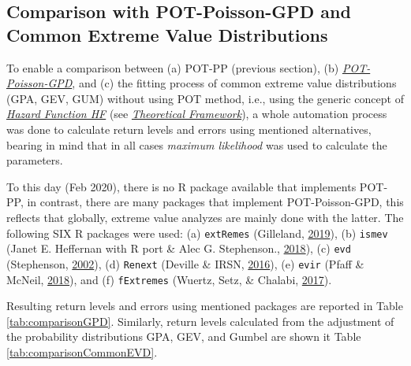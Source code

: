 \documentclass[12pt,twoside]{reedthesis}
\begin{document}
\hypertarget{comparison-with-pot-poisson-gpd-and-common-extreme-value-distributions}{%
\subsection{Comparison with POT-Poisson-GPD and Common Extreme Value Distributions}\label{comparison-with-pot-poisson-gpd-and-common-extreme-value-distributions}}

To enable a comparison between (a) POT-PP (previous section), (b) \emph{\protect\hyperlink{pot-poisson-gpd}{POT-Poisson-GPD}}, and (c) the fitting process of common extreme value distributions (GPA, GEV, GUM) without using POT method, i.e., using the generic concept of \emph{\protect\hyperlink{hf}{Hazard Function HF}} (see \emph{\protect\hyperlink{rmd-thefra}{Theoretical Framework}}), a whole automation process was done to calculate return levels and errors using mentioned alternatives, bearing in mind that in all cases \emph{maximum likelihood} was used to calculate the parameters.

To this day (Feb 2020), there is no R package available that implements POT-PP, in contrast, there are many packages that implement POT-Poisson-GPD, this reflects that globally, extreme value analyzes are mainly done with the latter. The following SIX R packages were used: (a) \texttt{extRemes} (Gilleland, \protect\hyperlink{ref-Gilleland2019}{2019}), (b) \texttt{ismev} (Janet E. Heffernan with R port \& Alec G. Stephenson., \protect\hyperlink{ref-JanetE.HeffernanwithRport2018}{2018}), (c) \texttt{evd} (Stephenson, \protect\hyperlink{ref-Stephenson2002}{2002}), (d) \texttt{Renext} (Deville \& IRSN, \protect\hyperlink{ref-Deville2016}{2016}), (e) \texttt{evir} (Pfaff \& McNeil, \protect\hyperlink{ref-Pfaff2018}{2018}), and (f) \texttt{fExtremes} (Wuertz, Setz, \& Chalabi, \protect\hyperlink{ref-Wuertz2017}{2017}).

Resulting return levels and errors using mentioned packages are reported in Table \ref{tab:comparisonGPD}. Similarly, return levels calculated from the adjustment of the probability distributions GPA, GEV, and Gumbel are shown it Table \ref{tab:comparisonCommonEVD}.
\end{document}
